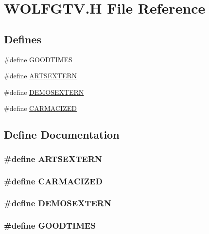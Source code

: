 \hypertarget{WOLFGTV_8H}{
\section{WOLFGTV.H File Reference}
\label{WOLFGTV_8H}
}
\subsection*{Defines}
\begin{DoxyCompactItemize}
\item 
\#define \hyperlink{WOLFGTV_8H_a3a7945b43181e458ece4deeac7949e73}{GOODTIMES}
\item 
\#define \hyperlink{WOLFGTV_8H_a36e8622d432bb1dcfc61ac233148b685}{ARTSEXTERN}
\item 
\#define \hyperlink{WOLFGTV_8H_aa38bbec192ab8931f108d382f7833c31}{DEMOSEXTERN}
\item 
\#define \hyperlink{WOLFGTV_8H_ab1d0a23b2e2640f4fbf73f30b3586f1b}{CARMACIZED}
\end{DoxyCompactItemize}


\subsection{Define Documentation}
\hypertarget{WOLFGTV_8H_a36e8622d432bb1dcfc61ac233148b685}{
\subsubsection[{ARTSEXTERN}]{\setlength{\rightskip}{0pt plus 5cm}\#define ARTSEXTERN}}
\label{WOLFGTV_8H_a36e8622d432bb1dcfc61ac233148b685}
\hypertarget{WOLFGTV_8H_ab1d0a23b2e2640f4fbf73f30b3586f1b}{
\subsubsection[{CARMACIZED}]{\setlength{\rightskip}{0pt plus 5cm}\#define CARMACIZED}}
\label{WOLFGTV_8H_ab1d0a23b2e2640f4fbf73f30b3586f1b}
\hypertarget{WOLFGTV_8H_aa38bbec192ab8931f108d382f7833c31}{
\subsubsection[{DEMOSEXTERN}]{\setlength{\rightskip}{0pt plus 5cm}\#define DEMOSEXTERN}}
\label{WOLFGTV_8H_aa38bbec192ab8931f108d382f7833c31}
\hypertarget{WOLFGTV_8H_a3a7945b43181e458ece4deeac7949e73}{
\subsubsection[{GOODTIMES}]{\setlength{\rightskip}{0pt plus 5cm}\#define GOODTIMES}}
\label{WOLFGTV_8H_a3a7945b43181e458ece4deeac7949e73}
